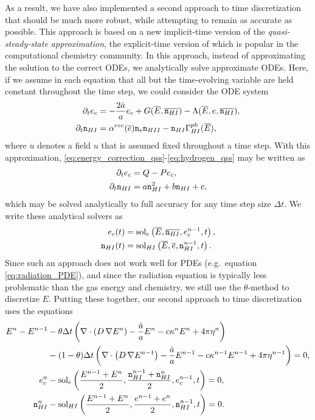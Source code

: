 \documentclass[letterpaper,10pt]{article}
\renewcommand{\(}{\left(}
\renewcommand{\)}{\right)}
\newcommand{\dt}{\Delta t}
\newcommand{\mn}{{\tt n}}
\begin{document}
As a result, we have also implemented a second approach to time
discretization that should be much more robust, while attempting to
remain as accurate as possible.  This approach is based on a new
implicit-time version of the {\em quasi-steady-state approximation},
the explicit-time version of which is popular in the computational
chemistry community.  In this approach, instead of approximating the
solution to the correct ODEs, we analytically solve approximate ODEs.
Here, if we assume in each equation that all but the time-evolving
variable are held constant throughout the time step, we could consider
the ODE system
\begin{align}
  \label{eq:energy_correction_qss}
  \partial_t e_c &= -\frac{2\dot{a}}{a}e_c + G(\overline{E},\overline{\mn_{HI}}) - \Lambda(\overline{E},e,\overline{\mn_{HI}}), \\
  \label{eq:hydrogen_qss}
  \partial_t \mn_{HI} &= \alpha^{rec}(\overline{e}) \mn_e \mn_{HII} - \mn_{HI} \Gamma_{HI}^{ph}(\overline{E}),
\end{align}
where $\overline{u}$ denotes a field $u$ that is assumed fixed
throughout a time step.  With this approximation,
\eqref{eq:energy_correction_qss}-\eqref{eq:hydrogen_qss} may be
written as
\begin{align}
  \label{eq:energy_correction_qss2}
  \partial_t e_c &= Q - Pe_c, \\
  \label{eq:hydrogen_qss2}
  \partial_t \mn_{HI} &= a \mn_{HI}^2 + b\mn_{HI} + c,
\end{align}
which may be solved analytically to full accuracy for any time step
size $\dt$.  We write these analytical solvers as
\begin{align}
  \label{eq:energy_correction_qss3}
  e_c(t) &= \text{sol}_e\left(\overline{E},\overline{\mn_{HI}},e_c^{n-1},t\right), \\
  \label{eq:hydrogen_qss3}
  \mn_{HI}(t) &= \text{sol}_{HI}\left(\overline{E},\overline{e},\mn_{HI}^{n-1},t\right).
\end{align}
Since such an approach does not work well for PDEs (e.g.~equation
\eqref{eq:radiation_PDE}), and since the radiation equation is
typically less problematic than the gas energy and chemistry, we still
use the $\theta$-method to discretize $E$.  Putting these together,
our second approach to time discretization uses the equations
\begin{align}
  \label{eq:radiation_PDE_iqss}
  E^n - E^{n-1} &- \theta\dt\left(\nabla\cdot\(D\,\nabla E^n\) - \frac{\dot{a}}{a} E^n -
    c\kappa^n E^n + 4\pi\eta^n\right) \\ 
  \notag
  & - (1-\theta)\dt\left(\nabla\cdot\(D\,\nabla E^{n-1}\) - \frac{\dot{a}}{a} E^{n-1} -
    c\kappa^{n-1} E^{n-1} + 4\pi\eta^{n-1}\right) = 0, \\ 
  \label{eq:energy_correction_iqss}
  e_c^n &- \text{sol}_e\left(\frac{E^{n-1}+E^n}{2},\frac{\mn_{HI}^{n-1}+\mn_{HI}^n}{2},e_c^{n-1},t\right) = 0, \\
  \label{eq:hydrogen_iqss}
  \mn_{HI}^n &- \text{sol}_{HI}\left(\frac{E^{n-1}+E^n}{2},\frac{e^{n-1}+e^n}{2},\mn_{HI}^{n-1},t\right) = 0.
\end{align}
\end{document}
